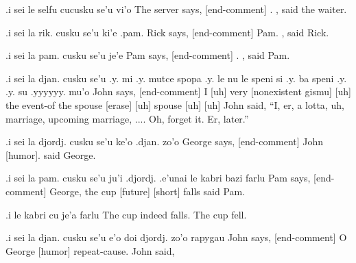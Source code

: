 \begin{example}
.i sei le selfu cucusku se'u\n
\T	vi'o\n
{} The server says, [end-comment]\n
{}.\n
{}, said the waiter.
\end{example}

\begin{example}
.i sei la rik. cusku se'u\n
\T	ki'e .pam.\n
{} Rick says, [end-comment]\n
\T	[Thanks O] Pam.\n
{}, said Rick.
\end{example}

\begin{example}
.i sei la pam. cusku se'u\n
\T	je'e\n
{} Pam says, [end-comment]\n
\T	[Acknowledge].\n
{}, said Pam.
\end{example}

\begin{example}
.i sei la djan. cusku se'u\n
\T	.y. mi .y. mutce spopa .y.\n
\T	le nu le speni si .y.\n
\T	ba speni .y. .y.\n
\T	su .yyyyyy. mu'o\n
{} John says, [end-comment]\n
\T	[Uh] I [uh] very [nonexistent gismu] [uh]\n
\T	the event-of the spouse [erase] [uh]\n
\T	[future] spouse [uh] [uh]\n
{}\n
John said, ``I, er, a lotta, uh, marriage,\n
\T	upcoming marriage, ....  Oh, forget it.\n
\T	Er, later.''
\end{example}

\begin{example}
.i sei la djordj. cusku se'u\n
\T	ke'o .djan. zo'o\n
{} George says, [end-comment]\n
\T	[Repeat O] John [humor].\n
{} said George.
\end{example}

\begin{example}
.i sei la pam. cusku se'u\n
\T	ju'i .djordj.\n
\T	.e'unai le kabri bazi farlu\n
{} Pam says, [end-comment]\n
\T	[Attention] George,\n
\T	[Warning] the cup [future] [short] falls\n
{} said Pam.  
\end{example}

\begin{example}
.i le kabri cu je'a farlu\n
The cup indeed falls.\n
The cup fell.
\end{example}

\begin{example}
.i sei la djan. cusku se'u\n
\T	e'o doi djordj. zo'o rapygau\n
{} John says, [end-comment]\n
\T	[Petition] O George [humor] repeat-cause.\n
John said, 
\end{example}

